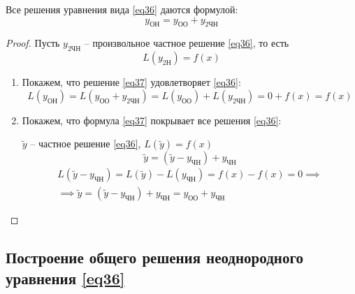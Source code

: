 \begin{theorem}
    Все решения уравнения вида \ref{eq36} даются формулой:
    \begin{equation}\label{eq37}
        y_{\text{ОН}} = y_{\text{ОО}} + y_{2\text{ЧН}}
    \end{equation}
\end{theorem}

\begin{proof}
    Пусть $y_{2\text{ЧН}}$ -- произвольное частное решение \ref{eq36}, то есть
    \[
        L(y_{2\text{Н}}) = f(x)
    \]
    \begin{enumerate}
        \item Покажем, что решение \ref{eq37} удовлетворяет \ref{eq36}:
              \[
                  L(y_{\text{ОН}}) = L(y_{\text{ОО}} + y_{2\text{ЧН}}) = L(y_{\text{ОО}}) + L(y_{2\text{ЧН}}) = 0 + f(x) = f(x)
              \]

        \item Покажем, что формула \ref{eq37} покрывает все решения \ref{eq36}:

              $\widetilde{y}$ -- частное решение \ref{eq36}, $L(\widetilde{y}) = f(x)$
              \[
                  \widetilde{y} = (\widetilde{y} - y_{\text{ЧН}}) + y_{\text{ЧН}}
              \]
              \begin{multline*}
                  L(\widetilde{y} - y_{\text{ЧН}}) = L(\widetilde{y}) - L(y_{\text{ЧН}}) = f(x) - f(x) = 0 \implies \\
                  \implies \widetilde{y} = (\widetilde{y} - y_{\text{ЧН}}) + y_{\text{ЧН}} = y_{\text{ОО}} + y_{\text{ЧН}}
              \end{multline*}
    \end{enumerate}
\end{proof}

\subsection*{Построение общего решения неоднородного уравнения \ref{eq36}}

